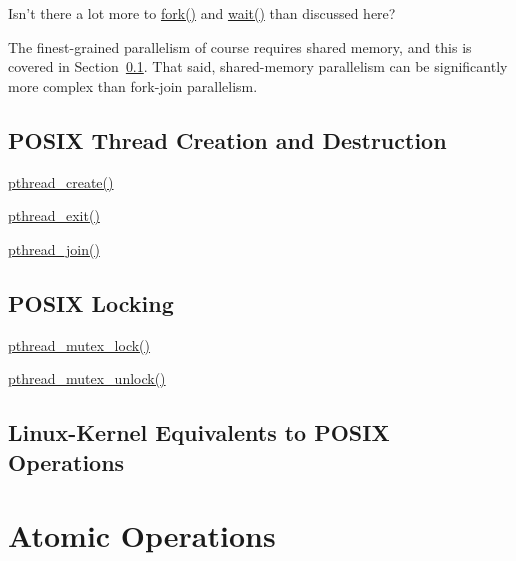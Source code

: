 \QuickQuiz{}
	Isn't there a lot more to \url{fork()} and \url{wait()}
	than discussed here?
 \QuickQuizEnd

The finest-grained parallelism of course requires shared memory, and
this is covered in
Section~\ref{sec:toolsoftrade:POSIX Thread Creation and Destruction}.
That said, shared-memory parallelism can be significantly more complex
than fork-join parallelism.

\subsection{POSIX Thread Creation and Destruction}
\label{sec:toolsoftrade:POSIX Thread Creation and Destruction}

\url{pthread_create()}

\url{pthread_exit()}

\url{pthread_join()}

\subsection{POSIX Locking}
\label{sec:toolsoftrade:POSIX Locking}

\url{pthread_mutex_lock()}

\url{pthread_mutex_unlock()}

\subsection{Linux-Kernel Equivalents to POSIX Operations}
\label{sec:toolsoftrade:Linux-Kernel Equivalents to POSIX Operations}

\section{Atomic Operations}
\label{sec:toolsoftrade:Atomic Operations}
